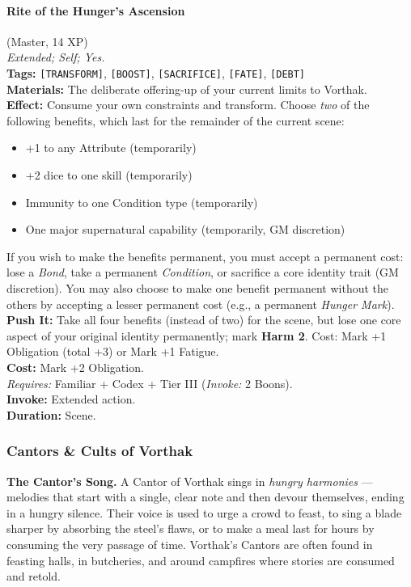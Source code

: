 \paragraph{Rite of the Hunger's Ascension} (Master, 14 XP) \hfill \\
\emph{Extended; Self; Yes.} \\
\textbf{Tags:} \texttt{[TRANSFORM]}, \texttt{[BOOST]}, \texttt{[SACRIFICE]}, \texttt{[FATE]}, \texttt{[DEBT]} \\
\textbf{Materials:} The deliberate offering-up of your current limits to Vorthak. \\
\textbf{Effect:} Consume your own constraints and transform. Choose \textit{two} of the following benefits, which last for the remainder of the current scene:
\begin{itemize}
  \item +1 to any Attribute (temporarily)
  \item +2 dice to one skill (temporarily)
  \item Immunity to one Condition type (temporarily)
  \item One major supernatural capability (temporarily, GM discretion)
\end{itemize}
If you wish to make the benefits permanent, you must accept a permanent cost: lose a \textit{Bond}, take a permanent \textit{Condition}, or sacrifice a core identity trait (GM discretion). You may also choose to make one benefit permanent without the others by accepting a lesser permanent cost (e.g., a permanent \textit{Hunger Mark}). \\
\textbf{Push It:} Take all four benefits (instead of two) for the scene, but lose one core aspect of your original identity permanently; mark \textbf{Harm 2}. Cost: Mark +1 Obligation (total +3) or Mark +1 Fatigue. \\
\textbf{Cost:} Mark +2 Obligation. \\
\textit{Requires:} Familiar + Codex + Tier III (\textit{Invoke:} 2 Boons). \\
\textbf{Invoke:} Extended action. \\
\textbf{Duration:} Scene.

\subsubsection*{Cantors \& Cults of Vorthak}

\textbf{The Cantor's Song.} A Cantor of Vorthak sings in \textit{hungry harmonies} --- melodies that start with a single, clear note and then devour themselves, ending in a hungry silence. Their voice is used to urge a crowd to feast, to sing a blade sharper by absorbing the steel's flaws, or to make a meal last for hours by consuming the very passage of time. Vorthak's Cantors are often found in feasting halls, in butcheries, and around campfires where stories are consumed and retold.

